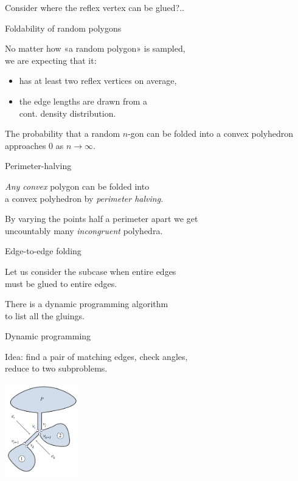 \documentclass[17pt]{extarticle}
\newcommand{\newslide}[1]{\newpage \begin{center} \large #1
                          \end{center} \vspace{-5.5mm}}
\begin{document}
Consider where the reflex vertex can be glued?..

\newslide{Foldability of random polygons}

No matter how «a random polygon» is sampled, \\
we are expecting that it: \vspace{-4mm}

\begin{itemize}
	\item has at least two reflex vertices on average,
	\item the edge lengths are drawn from a \\
	cont. density distribution.
\end{itemize} \vspace{-4mm}

The probability that a random $n$-gon can be folded into a convex polyhedron approaches 0 as \(n \to \infty\).

\newslide{Perimeter-halving}

{\it Any convex} polygon can be folded into \\
a convex polyhedron by {\it perimeter halving.}

By varying the points half a perimeter apart we get \\
uncountably many {\it incongruent} polyhedra.

\newslide{Edge-to-edge folding}

Let us consider the subcase when entire edges \\
must be glued to entire edges.

There is a dynamic programming algorithm \\
to list all the gluings.

\newslide{Dynamic programming}

Idea: find a pair of matching edges, check angles, \\
reduce to two subproblems.

\begin{center}
	\includegraphics[width=3.2cm]{minilec/dynprog}
\end{center}
\end{document}
